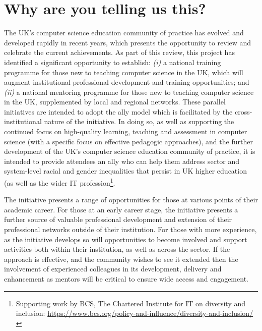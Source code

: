\documentclass[sigconf]{acmart}
\begin{document}
\section{Why are you telling us this?}	
The UK's computer science education community of practice has evolved and developed rapidly in recent years, which presents the opportunity to review and celebrate the current achievements. As part of this review, this project has identified a significant opportunity to establish: {\emph{(i)}} a national training programme for those new to teaching computer science in the UK, which will augment institutional professional development and training opportunities; and {\emph{(ii)}} a national mentoring programme for those new to teaching computer science in the UK, supplemented by local and regional networks. These parallel initiatives are intended to adopt the ally model which is facilitated by the cross-institutional nature of the initiative. In doing so, as well as supporting the continued focus on high-quality learning, teaching and assessment in computer science (with a specific focus on effective pedagogic approaches), and the further development of the UK's computer science education community of practice, it is intended to provide attendees an ally who can help them address sector and system-level racial and gender inequalities that persist in UK higher education (as well as the wider IT profession\footnote{Supporting work by BCS, The Chartered Institute for IT on diversity and inclusion: \url{https://www.bcs.org/policy-and-influence/diversity-and-inclusion/}}.

The initiative presents a range of opportunities for those at various points of their academic career. For those at an early career stage, the initiative presents a further source of valuable professional development and extension of their professional networks outside of their institution. For those with more experience, as the initiative develops so will opportunities to become involved and support activities both within their institution, as well as across the sector. If the approach is effective, and the community wishes to see it extended then the involvement of experienced colleagues in its development, delivery and enhancement as mentors will be critical to ensure wide access and engagement.






\balance
\end{document}

